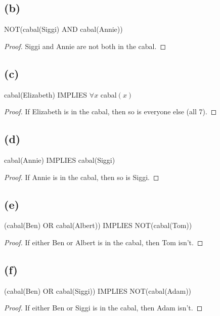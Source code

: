\documentclass[14pt]{extarticle}
\begin{document}
\subsection{(b)}
NOT(cabal(Siggi) AND cabal(Annie))
\begin{proof}
    Siggi and Annie are not both in the cabal.
\end{proof}
\subsection{(c)}
cabal(Elizabeth) IMPLIES $\forall x$ cabal$(x)$
\begin{proof}
    If Elizabeth is in the cabal, then so is everyone else (all 7).
\end{proof}
\subsection{(d)}
cabal(Annie) IMPLIES cabal(Siggi)
\begin{proof}
    If Annie is in the cabal, then so is Siggi.
\end{proof}
\subsection{(e)}
(cabal(Ben) OR cabal(Albert)) IMPLIES NOT(cabal(Tom))
\begin{proof}
    If either Ben or Albert is in the cabal, then Tom isn't.
\end{proof}
\subsection{(f)}
(cabal(Ben) OR cabal(Siggi)) IMPLIES NOT(cabal(Adam))
\begin{proof}
    If either Ben or Siggi is in the cabal, then Adam isn't.
\end{proof}
\end{document}
